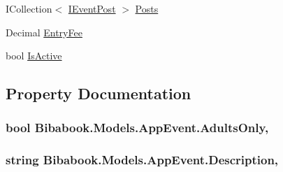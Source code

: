 \begin{DoxyCompactItemize}
\item 
I\+Collection$<$ \hyperlink{interface_contract_1_1_i_event_post}{I\+Event\+Post} $>$ \hyperlink{class_bibabook_1_1_models_1_1_app_event_a59ef083c6f4f43c0f589cb248eea0b67}{Posts}
\item 
Decimal \hyperlink{class_bibabook_1_1_models_1_1_app_event_a3b3e8c61d8a4b9c57b0af87f1d12fd2d}{Entry\+Fee}
\item 
bool \hyperlink{class_bibabook_1_1_models_1_1_app_event_ae2de1c915f1142374b0d9afe4f30a596}{Is\+Active}
\end{DoxyCompactItemize}


\subsection{Property Documentation}
\hypertarget{class_bibabook_1_1_models_1_1_app_event_a3790cdd6ba4f1cb6af661aa209741304}{}
\subsubsection[{Adults\+Only}]{\setlength{\rightskip}{0pt plus 5cm}bool Bibabook.\+Models.\+App\+Event.\+Adults\+Only\hspace{0.3cm}{\ttfamily [get]}, {\ttfamily [set]}}\label{class_bibabook_1_1_models_1_1_app_event_a3790cdd6ba4f1cb6af661aa209741304}
\hypertarget{class_bibabook_1_1_models_1_1_app_event_a708f5e987188de2194b658e65f0eccf8}{}
\subsubsection[{Description}]{\setlength{\rightskip}{0pt plus 5cm}string Bibabook.\+Models.\+App\+Event.\+Description\hspace{0.3cm}{\ttfamily [get]}, {\ttfamily [set]}}\label{class_bibabook_1_1_models_1_1_app_event_a708f5e987188de2194b658e65f0eccf8}
\hypertarget{class_bibabook_1_1_models_1_1_app_event_a3b3e8c61d8a4b9c57b0af87f1d12fd2d}{}
